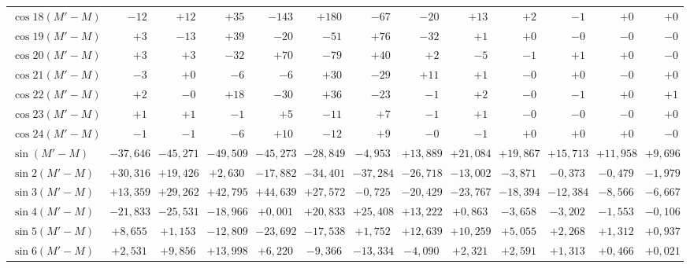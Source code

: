 \begin{landscape}
\begin{longtable}{@{}l|r|r|r|r|r|r|r|r|r|r|r|r@{}}
\(\cos 18(M'-M)\) & \(-12\) & \(+12\) & \(+35\) & \(-143\) & \(+180\) & \(-67\) & \(-20\) & \(+13\) & \(+2\) & \(-1\) & \(+0\) & \(+0\)\\
\(\cos 19(M'-M)\) & \(+3\) & \(-13\) & \(+39\) & \(-20\) & \(-51\) & \(+76\) & \(-32\) & \(+1\) & \(+0\) & \(-0\) & \(-0\) & \(-0\)\\
\(\cos 20(M'-M)\) & \(+3\) & \(+3\) & \(-32\) & \(+70\) & \(-79\) & \(+40\) & \(+2\) & \(-5\) & \(-1\) & \(+1\) & \(+0\) & \(-0\)\\
\(\cos 21(M'-M)\) & \(-3\) & \(+0\) & \(-6\) & \(-6\) & \(+30\) & \(-29\) & \(+11\) & \(+1\) & \(-0\) & \(+0\) & \(-0\) & \(+0\)\\
\(\cos 22(M'-M)\) & \(+2\) & \(-0\) & \(+18\) & \(-30\) & \(+36\) & \(-23\) & \(-1\) & \(+2\) & \(-0\) & \(-1\) & \(+0\) & \(+1\)\\
\(\cos 23(M'-M)\) & \(+1\) & \(+1\) & \(-1\) & \(+5\) & \(-11\) & \(+7\) & \(-1\) & \(+1\) & \(-0\) & \(-0\) & \(-0\) & \(+0\)\\
\(\cos 24(M'-M)\) & \(-1\) & \(-1\) & \(-6\) & \(+10\) & \(-12\) & \(+9\) & \(-0\) & \(-1\) & \(+0\) & \(+0\) & \(+0\) & \(-0\)\\[6pt]
\(\sin(M'-M)\) & \(-37{,}646\) & \(-45{,}271\) & \(-49{,}509\) & \(-45{,}273\) & \(-28{,}849\) & \(-4{,}953\) & \(+13{,}889\) & \(+21{,}084\) & \(+19{,}867\) & \(+15{,}713\) & \(+11{,}958\) & \(+9{,}696\)\\
\(\sin 2(M'-M)\) & \(+30{,}316\) & \(+19{,}426\) & \(+2{,}630\) & \(-17{,}882\) & \(-34{,}401\) & \(-37{,}284\) & \(-26{,}718\) & \(-13{,}002\) & \(-3{,}871\) & \(-0{,}373\) & \(-0{,}479\) & \(-1{,}979\)\\
\(\sin 3(M'-M)\) & \(+13{,}359\) & \(+29{,}262\) & \(+42{,}795\) & \(+44{,}639\) & \(+27{,}572\) & \(-0{,}725\) & \(-20{,}429\) & \(-23{,}767\) & \(-18{,}394\) & \(-12{,}384\) & \(-8{,}566\) & \(-6{,}667\)\\
\(\sin 4(M'-M)\) & \(-21{,}833\) & \(-25{,}531\) & \(-18{,}966\) & \(+0{,}001\) & \(+20{,}833\) & \(+25{,}408\) & \(+13{,}222\) & \(+0{,}863\) & \(-3{,}658\) & \(-3{,}202\) & \(-1{,}553\) & \(-0{,}106\)\\
\(\sin 5(M'-M)\) & \(+8{,}655\) & \(+1{,}153\) & \(-12{,}809\) & \(-23{,}692\) & \(-17{,}538\) & \(+1{,}752\) & \(+12{,}639\) & \(+10{,}259\) & \(+5{,}055\) & \(+2{,}268\) & \(+1{,}312\) & \(+0{,}937\)\\
\(\sin 6(M'-M)\) & \(+2{,}531\) & \(+9{,}856\) & \(+13{,}998\) & \(+6{,}220\) & \(-9{,}366\) & \(-13{,}334\) & \(-4{,}090\) & \(+2{,}321\) & \(+2{,}591\) & \(+1{,}313\) & \(+0{,}466\) & \(+0{,}021\)\\

\end{longtable}
\end{landscape}
